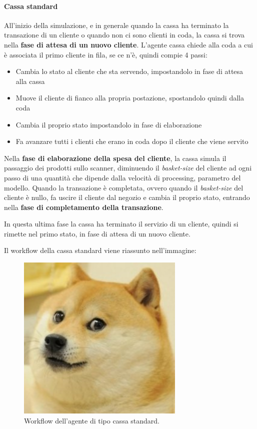\paragraph{Cassa standard}
All'inizio della simulazione, e in generale quando la cassa ha terminato la transazione di un cliente o quando non ci sono clienti in coda, la cassa si trova nella \textbf{fase di attesa di un nuovo cliente}. L'agente cassa chiede alla coda a cui è associata il primo cliente in fila, se ce n'è, quindi compie 4 passi:
\begin{itemize}
\item Cambia lo stato al cliente che sta servendo, impostandolo in fase di attesa alla cassa
\item Muove il cliente di fianco alla propria postazione, spostandolo quindi dalla coda
\item Cambia il proprio stato impostandolo in fase di elaborazione
\item Fa avanzare tutti i clienti che erano in coda dopo il cliente che viene servito
\end{itemize}

Nella \textbf{fase di elaborazione della spesa del cliente}, la cassa simula il passaggio dei prodotti sullo scanner, diminuendo il \textit{basket-size} del cliente ad ogni passo di una quantità che dipende dalla velocità di processing, parametro del modello. Quando la transazione è completata, ovvero quando il \textit{basket-size} del cliente è nullo, fa uscire il cliente dal negozio e cambia il proprio stato, entrando nella \textbf{fase di completamento della transazione}.

In questa ultima fase la cassa ha terminato il servizio di un cliente, quindi si rimette nel primo stato, in fase di attesa di un nuovo cliente.

Il workflow della cassa standard viene riassunto nell'immagine:

\begin{figure}[htp!]
	\centering
	\hspace*{3cm}
	\includegraphics[width=8cm]{"images/doggo.jpg"}
	\caption{Workflow dell'agente di tipo cassa standard.}
	\label{fig:workflow_customer}
\end{figure}

